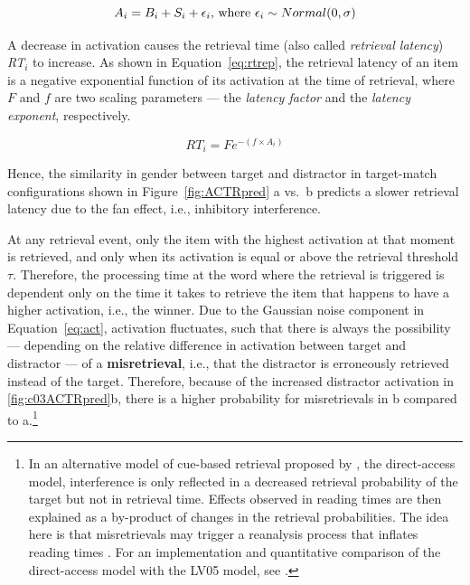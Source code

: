 \documentclass{cambridge7A}\usepackage[]{graphicx}\usepackage[]{color}
\newcommand{\revFE}[1]{#1}
\begin{document}
\begin{equation}
  A_i = B_i + S_i + \epsilon_i  \hbox{, where } \epsilon_i \sim Normal(0,\sigma)  \label{eq:act}
\end{equation}

A decrease in activation causes the retrieval time \revFE{(also called \emph{retrieval latency})} \textit{RT}$_i$ to increase. As shown in Equation~\ref{eq:rtrep}, the \revFE{retrieval latency} of an item is a negative exponential function of its activation at the time of retrieval, where $F$ and $f$ are two scaling parameters --- the \emph{latency factor} and the \emph{latency exponent}, respectively.

\begin{equation}
  \textit{RT}_i = Fe^{-(f\times A_i)} \label{eq:rtrep}
\end{equation}

Hence, the similarity in gender between target and distractor in target-match configurations shown in Figure~\ref{fig:ACTRpred} a vs.\ b predicts a slower retrieval latency due to the fan effect, \revFE{i.e., inhibitory interference}.
\revFE{
At any retrieval event, only the item with the highest activation at that moment is retrieved, and only when its activation is equal or above the retrieval threshold $\tau$. Therefore, the processing time at the word where the retrieval is triggered is dependent only on the time it takes to retrieve the item that happens to have a higher activation, i.e., the winner.
Due to the Gaussian noise component in Equation~\ref{eq:act}, activation fluctuates, such that there is always the possibility --- depending on the relative difference in activation between target and distractor --- of a \textbf{misretrieval}, i.e., that the distractor is erroneously retrieved instead of the target. 
Therefore, because of the increased distractor activation in \ref{fig:c03ACTRpred}b, there is a higher probability for misretrievals in b compared to a.}\footnote{%
In an alternative model of cue-based retrieval proposed by \cite{McElree2006}, the direct-access model, interference is only reflected in a decreased retrieval probability of the target but not in retrieval time. 
  Effects observed in reading times are then explained as a by-product of changes in the retrieval probabilities. The idea here is that misretrievals may trigger a reanalysis process that inflates reading times \citep{McElree1993}. For an implementation and quantitative comparison of the direct-access model \citep{McElree2006} with the LV05 model, see \cite{NicenboimRetrieval2018}.}
\end{document}
